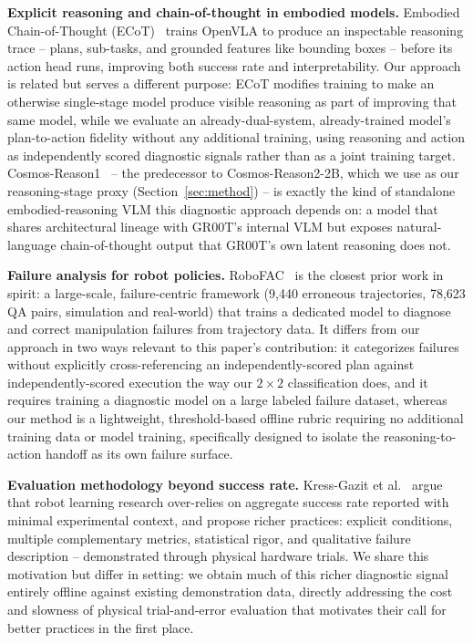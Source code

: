 \documentclass[conference]{IEEEtran}
\begin{document}
\textbf{Explicit reasoning and chain-of-thought in embodied models.} Embodied
Chain-of-Thought (ECoT)~\cite{zawalski2024ecot} trains OpenVLA to produce an inspectable
reasoning trace -- plans, sub-tasks, and grounded features like bounding boxes -- before
its action head runs, improving both success rate and interpretability. Our approach is
related but serves a different purpose: ECoT modifies training to make an otherwise
single-stage model produce visible reasoning as part of improving that same model, while
we evaluate an already-dual-system, already-trained model's plan-to-action fidelity
without any additional training, using reasoning and action as independently scored
diagnostic signals rather than as a joint training target.
Cosmos-Reason1~\cite{azzolini2025cosmosreason1} -- the predecessor to Cosmos-Reason2-2B,
which we use as our reasoning-stage proxy (Section~\ref{sec:method}) -- is exactly the
kind of standalone embodied-reasoning VLM this diagnostic approach depends on: a model
that shares architectural lineage with GR00T's internal VLM but exposes natural-language
chain-of-thought output that GR00T's own latent reasoning does not.

\textbf{Failure analysis for robot policies.} RoboFAC~\cite{ye2025robofac} is the closest
prior work in spirit: a large-scale, failure-centric framework (9{,}440 erroneous
trajectories, 78{,}623 QA pairs, simulation and real-world) that trains a dedicated model
to diagnose and correct manipulation failures from trajectory data. It differs from our
approach in two ways relevant to this paper's contribution: it categorizes failures
without explicitly cross-referencing an independently-scored plan against
independently-scored execution the way our $2\times2$ classification does, and it
requires training a diagnostic model on a large labeled failure dataset, whereas our
method is a lightweight, threshold-based offline rubric requiring no additional training
data or model training, specifically designed to isolate the reasoning-to-action handoff
as its own failure surface.

\textbf{Evaluation methodology beyond success rate.} Kress-Gazit et
al.~\cite{kressgazit2024empirical} argue that robot learning research over-relies on
aggregate success rate reported with minimal experimental context, and propose richer
practices: explicit conditions, multiple complementary metrics, statistical rigor, and
qualitative failure description -- demonstrated through physical hardware trials. We
share this motivation but differ in setting: we obtain much of this richer diagnostic
signal entirely offline against existing demonstration data, directly addressing the cost
and slowness of physical trial-and-error evaluation that motivates their call for better
practices in the first place.
\end{document}
